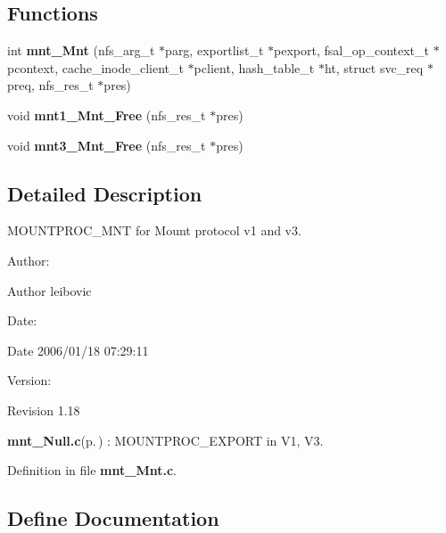 \subsection*{Functions}
\begin{CompactItemize}
\item 
int {\bf mnt\_\-Mnt} (nfs\_\-arg\_\-t $\ast$parg, exportlist\_\-t $\ast$pexport, fsal\_\-op\_\-context\_\-t $\ast$pcontext, cache\_\-inode\_\-client\_\-t $\ast$pclient, hash\_\-table\_\-t $\ast$ht, struct svc\_\-req $\ast$preq, nfs\_\-res\_\-t $\ast$pres)
\item 
void {\bf mnt1\_\-Mnt\_\-Free} (nfs\_\-res\_\-t $\ast$pres)
\item 
void {\bf mnt3\_\-Mnt\_\-Free} (nfs\_\-res\_\-t $\ast$pres)
\end{CompactItemize}


\subsection{Detailed Description}
MOUNTPROC\_\-MNT for Mount protocol v1 and v3. 

\begin{Desc}
\item[Author:]\begin{Desc}
\item[Author]leibovic \end{Desc}
\end{Desc}
\begin{Desc}
\item[Date:]\begin{Desc}
\item[Date]2006/01/18 07:29:11 \end{Desc}
\end{Desc}
\begin{Desc}
\item[Version:]\begin{Desc}
\item[Revision]1.18 \end{Desc}
\end{Desc}
{\bf mnt\_\-Null.c}{\rm (p.\,\pageref{mnt__Null_8c})} : MOUNTPROC\_\-EXPORT in V1, V3.

Definition in file {\bf mnt\_\-Mnt.c}.

\subsection{Define Documentation}
